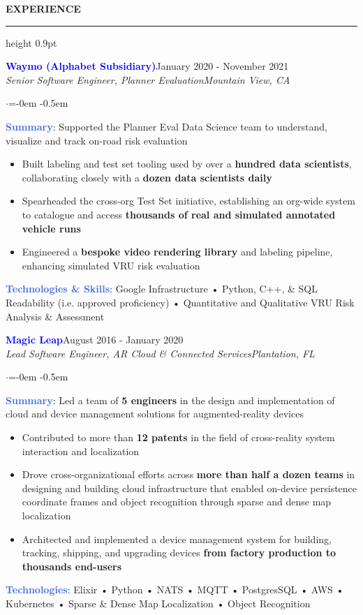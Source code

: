 \documentclass[
    11pt, %
]{resume} %
\newenvironment{rSectionCustom}[1]{
  \Large
  \sectionskip
  \textbf{\textcolor{Cerulean}{\MakeUppercase{#1}}}
  \vspace{0.5em}
  {\color{Blue}\hrule height 0.9pt}
  \vspace{0.25em}

  \begin{list}{}{
    \setlength{\leftmargin}{1.5em}
  }
  \item[]
}{
    \vspace{1em}
    \end{list}
}
\newenvironment{rSubsection2}[4]{
  \normalsize
  \hspace{-18pt}\textcolor{Blue}{\textbf{\large #1}}\hfill{#2}
  \\
  \hspace*{-18pt}\emph{#3}\hfill\emph{#4}
  \begin{list}{$\cdot$}{\leftmargin=-0em}
  \itemsep -0.5em \vspace{-0.25em}
}{
    \vspace{1em}
    \end{list}
}
\begin{document}
\begin{rSectionCustom}{Experience}
    \begin{rSubsection2}{Waymo (Alphabet Subsidiary)}{January 2020 - November 2021}{Senior Software Engineer, Planner Evaluation}{Mountain View, CA}
        \item[] \textcolor{RoyalBlue}{\textbf{Summary}}: Supported the Planner Eval Data Science team to understand, visualize and track on-road risk evaluation
        \begin{itemize}[leftmargin=*]
            \item Built labeling and test set tooling used by over a \textbf{hundred data scientists}, collaborating closely with a \textbf{dozen data scientists daily}
            \item Spearheaded the cross-org Test Set initiative, establishing an org-wide system to catalogue and access \textbf{thousands of real and simulated annotated vehicle runs}
            \item Engineered a \textbf{bespoke video rendering library} and labeling pipeline, enhancing simulated VRU risk evaluation
        \end{itemize}
        \vspace{0.5em}
        \item[] \textcolor{RoyalBlue}{\textbf{Technologies \& Skills}}: Google Infrastructure • Python, C++, \& SQL Readability (i.e. approved proficiency) • Quantitative and Qualitative VRU Risk Analysis \& Assessment
    \end{rSubsection2}

    \begin{rSubsection2}{Magic Leap}{August 2016 - January 2020}{Lead Software Engineer, AR Cloud \& Connected Services}{Plantation, FL}
        \item[] \textcolor{RoyalBlue}{\textbf{Summary}}: Led a team of \textbf{5 engineers} in the design and implementation of cloud and device management solutions for augmented-reality devices
        \begin{itemize}[leftmargin=*]
            \item Contributed to more than \textbf{12 patents} in the field of cross-reality system interaction and localization
            \item Drove cross-organizational efforts across \textbf{more than half a dozen teams} in designing and building cloud infrastructure that enabled on-device persistence coordinate frames and object recognition through sparse and dense map localization
            \item Architected and implemented a device management system for building, tracking, shipping, and upgrading devices \textbf{from factory production to thousands end-users}
            \end{itemize}
        \vspace{0.5em}
        \item[] \textcolor{RoyalBlue}{\textbf{Technologies}}: Elixir • Python • NATS • MQTT • PostgresSQL • AWS • Kubernetes • Sparse \& Dense Map Localization • Object Recognition
    \end{rSubsection2}


\end{rSectionCustom}
\end{document}
